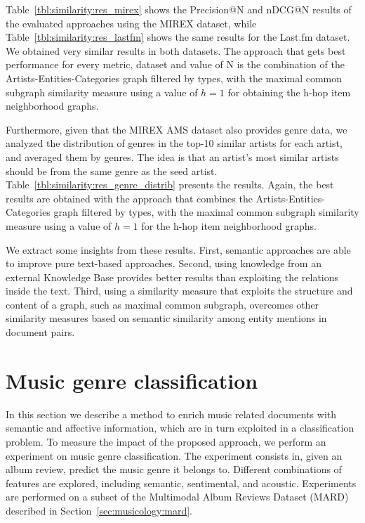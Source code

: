 Table~\ref{tbl:similarity:res_mirex} shows the Precision@N and nDCG@N results of the evaluated approaches using the MIREX dataset, while Table~\ref{tbl:similarity:res_lastfm} shows the same results for the Last.fm dataset. We obtained very similar results in both datasets. The approach that gets best performance for every metric, dataset and value of N is the combination of the Artists-Entities-Categories graph filtered by types, with the maximal common subgraph similarity measure using a value of $h=1$ for obtaining the h-hop item neighborhood graphs.

Furthermore, given that the MIREX AMS dataset also provides genre data, we analyzed the distribution of genres in the top-10 similar artists for each artist, and averaged them by genres. The idea is that an artist's most similar artists should be from the same genre as the seed artist.
Table~\ref{tbl:similarity:res_genre_distrib} presents the results. Again, the best results are obtained with the approach that combines the Artists-Entities-Categories graph filtered by types, with the maximal common subgraph similarity measure using a value of $h=1$ for the h-hop item neighborhood graphs.

We extract some insights from these results. First, semantic approaches are able to improve pure text-based approaches. Second, using knowledge from an external Knowledge Base provides better results than exploiting the relations inside the text. Third, using a similarity measure that exploits the structure and content of a graph, such as maximal common subgraph, overcomes other similarity measures based on semantic similarity among entity mentions in document pairs.


\section{Music genre classification}\label{sec:similarity:classification}

In this section we describe a method to enrich music related documents with semantic and affective information, which are in turn exploited in a classification problem. To measure the impact of the proposed approach, we perform an experiment on music genre classification. The experiment consists in, given an album review, predict the music genre it belongs to. Different combinations of features are explored, including semantic, sentimental, and acoustic. Experiments are performed on a subset of the Multimodal Album Reviews Dataset (MARD) described in Section~\ref{sec:musicology:mard}.


